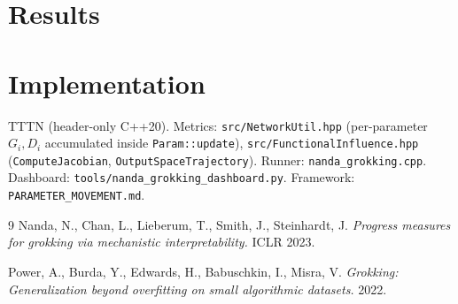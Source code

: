 \documentclass[11pt]{article}
\begin{document}
\section{Results}



\section*{Implementation}

TTTN (header-only C++20). Metrics: \texttt{src/NetworkUtil.hpp} (per-parameter $G_i, D_i$
accumulated inside \texttt{Param::update}), \texttt{src/FunctionalInfluence.hpp}
(\texttt{ComputeJacobian}, \texttt{OutputSpaceTrajectory}). Runner:
\texttt{nanda\_grokking.cpp}. Dashboard: \texttt{tools/nanda\_grokking\_dashboard.py}.
Framework: \texttt{PARAMETER\_MOVEMENT.md}.

\begin{thebibliography}{9}
Nanda, N., Chan, L., Lieberum, T., Smith, J., Steinhardt, J.
\emph{Progress measures for grokking via mechanistic interpretability.} ICLR 2023.

Power, A., Burda, Y., Edwards, H., Babuschkin, I., Misra, V.
\emph{Grokking: Generalization beyond overfitting on small algorithmic datasets.} 2022.
\end{thebibliography}
\end{document}
